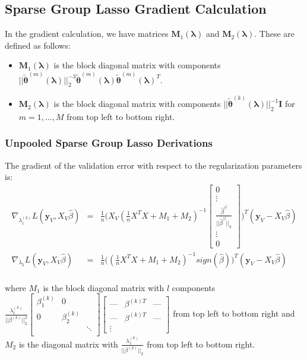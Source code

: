 \documentclass[10pt,letterpaper]{article}
\begin{document}
\subsection{Sparse Group Lasso Gradient Calculation}
In the gradient calculation, we have matrices $\boldsymbol{M}_1(\boldsymbol\lambda)$ and $\boldsymbol{M}_2(\boldsymbol\lambda)$. These are defined as follows:
\begin{itemize}
\item
$\boldsymbol{M}_1(\boldsymbol\lambda)$ is the block diagonal matrix with  components 
$
|| \tilde{\boldsymbol{\theta}}^{(m)}(\boldsymbol{\lambda})||_2^{-3} \tilde{\boldsymbol{\theta}}^{(m)}(\boldsymbol{\lambda}) \tilde{\boldsymbol{\theta}}^{(m)}(\boldsymbol{\lambda})^T
$.
\item
$\boldsymbol{M}_2(\boldsymbol\lambda)$ is the block diagonal matrix with components
$||\tilde{\boldsymbol{\theta}}^{(k)}(\boldsymbol{\lambda})||_2^{-1} \boldsymbol{I}$
for $m = 1, ..., M$ 
from top left to bottom right.
\end{itemize}

\subsubsection{Unpooled Sparse Group Lasso Derivations}
The gradient of the validation error with respect to the regularization parameters is:
\begin{equation}
\begin{array}{lcl}
\nabla_{\lambda_1^{(k)}} L(\boldsymbol y_V, X_V \hat \beta) &=& 
\frac{1}{n}
\Bigg (
X_V
(\frac{1}{n} X^T X + M_1 + M_2)^{-1}
\begin{bmatrix}
0 \\
\vdots \\
\frac{\hat\beta^{(l}}{||\hat\beta^{(l}||_2}\\
\vdots\\
0
\end{bmatrix}
\Bigg )^T
(\boldsymbol y_V - X_V \hat \beta)
 \\
\nabla_{\lambda_2} L(\boldsymbol y_V, X_V \hat \beta) &=&
\frac{1}{n}
\Bigg (
(\frac{1}{n} X^T X + M_1 + M_2)^{-1} sign(\hat \beta)
\Bigg )^T
(\boldsymbol y_V - X_V \hat \beta)
\\ 
\end{array}
\end{equation}

where $M_1$ is the block diagonal matrix with $l$ components 
$
\frac{\lambda_1^{(k)}}{|| \beta^{(k)}||_2^3}
\begin{bmatrix} 
\beta_1^{(k)} & 0 & \\
0 & \beta_2^{(k)} &  \\
 &  & \ddots \\
\end{bmatrix}
\begin{bmatrix}
\text{---} & \beta^{(k)T} & \text{---} \\
\text{---} & \beta^{(k)T} & \text{---} \\
\vdots
\end{bmatrix}
$ from top left to bottom right and $M_2$ is the diagonal matrix with $\frac{\lambda_1^{(k)}}{|| \beta^{(k)}||_2}$ from top left to bottom right.
\end{document}
